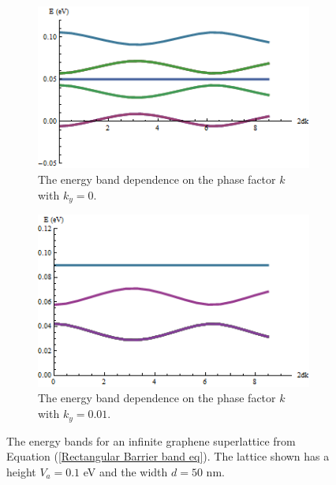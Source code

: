 \documentclass[12pt,a4paper]{report}
\begin{document}
			\begin{figure}
				\begin{subfigure}{0.5\textwidth}
					\centerline{\includegraphics[scale=0.6]{images/superlattice-bands-k}}
					\caption{The energy band dependence on the phase factor $k$ with $k_{y}=0$.}
				\end{subfigure}
				\hspace{0.6cm}
				\begin{subfigure}{0.5\textwidth}
					\centerline{\includegraphics[scale=0.6]{images/superlattice-bands}}
					\caption{The energy band dependence on the phase factor $k$ with $k_{y}=0.01$.}
				\end{subfigure}
				\caption{The energy bands for an infinite graphene superlattice from Equation (\ref{Rectangular Barrier band eq}). The lattice shown has a height $V_{a}=0.1$ eV and the width $d=50$ nm.}
				\label{superlattice-bands}
			\end{figure}
\end{document}
